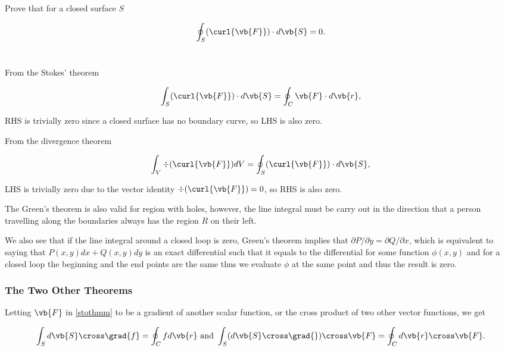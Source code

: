 \documentclass[english,a4paper,12pt]{report}
\begin{document}
{Prove that for a closed surface \(S\) 

\begin{equation}
	\oint_{S} (\curl{\vb{F} } ) \cdot d\vb{S} = 0.
\end{equation}
~
}
{From the Stokes' theorem 

\begin{equation}
	\int_{S}^{} (\curl{\vb{F} } ) \cdot d\vb{S} = \oint_{C} \vb{F} \cdot d\vb{r} , 
\end{equation}

RHS is trivially zero since a closed surface has no boundary curve, so LHS is also zero.

From the divergence theorem

\begin{equation}
	\int_{V}^{} \div{(\curl{\vb{F} } )} dV = \oint_{S} (\curl{\vb{F} } ) \cdot d\vb{S} , 
\end{equation}

LHS is trivially zero due to the vector identity \(\div{(\curl{\vb{F} } )} = 0 \), so RHS is also zero. 
} 

The Green's theorem is also valid for region with holes, however, the line integral must be carry out in the direction that a person travelling along the boundaries always has the region \(R\) on their left.

We also see that if the line integral around a closed loop is zero, Green's theorem implies that \(\partial P /\partial y = \partial Q /\partial x\), which is equivalent to saying that \(P(x,y) dx + Q(x,y) dy \) is an exact differential such that it equals to the differential for some function \(\phi (x,y)\) and for a closed loop the beginning and the end points are the same thus we evaluate \(\phi \) at the same point and thus the result is zero.

\subsubsection{The Two Other Theorems}

Letting \(\vb{F} \) in \cref{stothmm} to be a gradient of another scalar function, or the cross product of two other vector functions, we get 

\begin{equation}
	\int_{S}^{} d\vb{S} \cross \grad{f} = \oint_{C} fd\vb{r} \text { and } \int_{S}^{} (d\vb{S} \cross \grad{} ) \cross \vb{F} = \oint_{C} d\vb{r} \cross \vb{F} .    
\end{equation}
\end{document}
